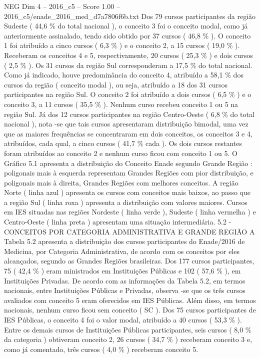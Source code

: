 \begin{textsample}{NEG Dim 4 – 2016\_c5 – Score 1.00 – 2016\_c5/enade\_2016\_med\_d7a7806f6b.txt}
Dos 79 cursos participantes da região Sudeste ( 44,6 \% do total nacional ), o conceito 3 foi o conceito modal, como já anteriormente assinalado, tendo sido obtido por 37 cursos ( 46,8 \% ).
O conceito 1 foi atribuído a cinco cursos ( 6,3 \% ) e o conceito 2, a 15 cursos ( 19,0 \% ).
Receberam os conceitos 4 e 5, respectivamente, 20 cursos ( 25,3 \% ) e dois cursos ( 2,5 \% ).
Os 31 cursos da região Sul corresponderam a 17,5 \% do total nacional.
Como já indicado, houve predominância do conceito 4, atribuído a 58,1 \% dos cursos da região ( conceito modal ), ou seja, atribuído a 18 dos 31 cursos participantes na região Sul.
O conceito 2 foi atribuído a dois cursos ( 6,5 \% ) e o conceito 3, a 11 cursos ( 35,5 \% ).
Nenhum curso recebeu conceito 1 ou 5 na região Sul.
Já dos 12 cursos participantes na região Centro-Oeste ( 6,8 \% do total nacional ), nota -se que tais cursos apresentaram distribuição bimodal, uma vez que as maiores frequências se concentraram em dois conceitos, os conceitos 3 e 4, atribuídos, cada qual, a cinco cursos ( 41,7 \% cada ).
Os dois cursos restantes foram atribuídos ao conceito 2 e nenhum curso ficou com conceito 1 ou 5.
O Gráfico 5.1 apresenta a distribuição do Conceito Enade segundo Grande Região : poligonais mais à esquerda representam Grandes Regiões com pior distribuição, e poligonais mais à direita, Grandes Regiões com melhores conceitos.
A região Norte ( linha azul ) apresenta os cursos com conceitos mais baixos, ao passo que a região Sul ( linha roxa ) apresenta a distribuição com valores maiores.
Cursos em IES situadas nas regiões Nordeste ( linha verde ), Sudeste ( linha vermelha ) e Centro-Oeste ( linha preta ) apresentam uma situação intermediária. 5.2 - CONCEITOS POR CATEGORIA ADMINISTRATIVA E GRANDE REGIÃO A Tabela 5.2 apresenta a distribuição dos cursos participantes do Enade/2016 de Medicina, por Categoria Administrativa, de acordo com os conceitos por eles alcançados, segundo as Grandes Regiões brasileiras.
Dos 177 cursos participantes, 75 ( 42,4 \% ) eram ministrados em Instituições Públicas e 102 ( 57,6 \% ), em Instituições Privadas.
De acordo com as informações da Tabela 5.2, em termos nacionais, entre Instituições Públicas e Privadas, observa -se que os três cursos avaliados com conceito 5 eram oferecidos em IES Públicas.
Além disso, em termos nacionais, nenhum curso ficou sem conceito ( SC ).
Dos 75 cursos participantes de IES Públicas, o conceito 4 foi o valor modal, atribuído a 40 cursos ( 53,3 \% ).
Entre os demais cursos de Instituições Públicas participantes, seis cursos ( 8,0 \% da categoria ) obtiveram conceito 2, 26 cursos ( 34,7 \% ) receberam conceito 3 e, como já comentado, três cursos ( 4,0 \% ) receberam conceito 5.

\end{textsample}
